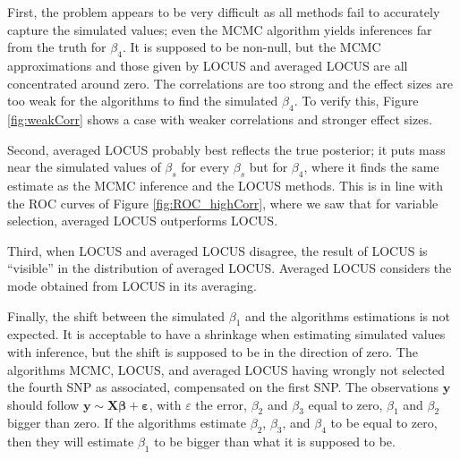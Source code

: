 \documentclass[a4paper, 11pt]{report}
\numberwithin{equation}{chapter}
\begin{document}
First, the problem appears to be very difficult as all methods  fail to accurately capture the simulated values; even the MCMC algorithm yields inferences far from the truth for $\beta_4$. It is supposed to be non-null, but the MCMC approximations and those given by LOCUS and averaged LOCUS are all concentrated around zero. The correlations are too strong and the effect sizes are too weak for the algorithms to find the simulated $\beta_4$. To verify this, Figure \ref{fig:weakCorr} shows a case with weaker correlations and stronger effect sizes.

Second, averaged LOCUS probably best reflects the true posterior; it puts mass near the simulated values of $\beta_s$ for every $\beta_s$ but for $\beta_4$, where it finds the same estimate as the MCMC inference and the LOCUS methods. This is in line with the ROC curves of Figure \ref{fig:ROC_highCorr}, where we saw that for variable selection, averaged LOCUS outperforms LOCUS.

Third, when LOCUS and averaged LOCUS disagree, the result of LOCUS is ``visible'' in the distribution of averaged LOCUS. Averaged LOCUS considers the mode obtained from LOCUS in its averaging.

Finally, the shift between the simulated $\beta_1$ and the algorithms estimations is not expected. It is acceptable to have a shrinkage when estimating simulated values with inference, but the shift is supposed to be in the direction of zero. The algorithms MCMC, LOCUS, and averaged LOCUS having wrongly not selected the fourth SNP as associated, compensated on the first SNP. The observations $\boldsymbol{y}$ should follow $\boldsymbol{y} \sim \boldsymbol{X}\boldsymbol{\beta} + \boldsymbol{\varepsilon}$, with $\varepsilon$ the error, $\beta_2$ and $\beta_3$ equal to zero, $\beta_1$ and $\beta_2$ bigger than zero. If the algorithms estimate $\beta_2$, $\beta_3$, and $\beta_4$ to be equal to zero, then they will estimate $\beta_1$ to be bigger than what it is supposed to be.
\end{document}
